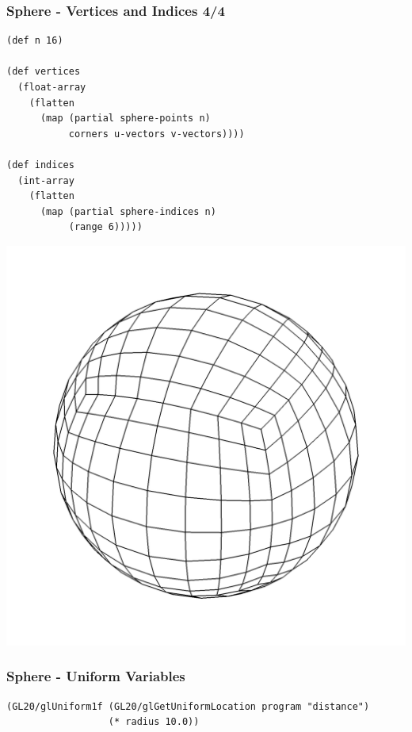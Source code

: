 \documentclass[aspectratio=169,11pt,xcolor=dvipsnames]{beamer}
\begin{document}
\begin{frame}[fragile]
  \frametitle{Sphere {-} Vertices and Indices 4/4}
  \begin{minipage}[b]{0.6\textwidth}
    \begin{verbatim}
(def n 16)

(def vertices
  (float-array
    (flatten
      (map (partial sphere-points n)
           corners u-vectors v-vectors))))

(def indices
  (int-array
    (flatten
      (map (partial sphere-indices n)
           (range 6)))))
    \end{verbatim}
  \end{minipage}
  \begin{minipage}[b]{0.38\textwidth}
    \includegraphics[width=\textwidth]{mesh}
  \end{minipage}
\end{frame}

\begin{frame}[fragile]
  \frametitle{Sphere {-} Uniform Variables}
  \begin{verbatim}
(GL20/glUniform1f (GL20/glGetUniformLocation program "distance")
                  (* radius 10.0))
  \end{verbatim}
\end{frame}
\end{document}
